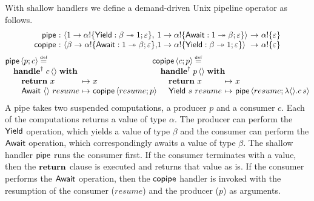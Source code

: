\documentclass[12pt,phd,lfcs,twoside,openright,logo,leftchapter,normalheadings]{infthesis}
\theoremstyle{plain}
\theoremstyle{definition}
\begin{document}
With shallow handlers we define a demand-driven Unix pipeline operator
as follows.
%
\[
    \ba{@{}c@{}}
    \ba{@{}r@{~}c@{~}l@{}l@{~}c@{~}l@{}}
    \Pipe   &:& \Record{\UnitType \to \alpha ! \{ \Yield : \beta \opto \UnitType; \varepsilon \}, &\UnitType \to \alpha!\{ \Await : \UnitType \opto \beta; \varepsilon \}}          &\to& \alpha!\{\varepsilon\} \\
    \Copipe &:& \Record{\beta \to \alpha!\{ \Await : \UnitType \opto \beta; \varepsilon\},    &\UnitType \to \alpha!\{ \Yield : \beta \opto \UnitType; \varepsilon\}} &\to& \alpha!\{\varepsilon\} \\
    \ea \medskip \\
    \ba{@{}l@{\hspace{-0em}}@{\hspace{-2mm}}l@{}}
    \ba[t]{@{}l@{}}
    \Pipe\, \Record{p; c} \defas \\
    \quad
        \bl
        \ShallowHandle\; c\,\Unit \;\With\; \\
        \quad
        \ba[m]{@{}l@{~}c@{~}l@{}}
           \Return~x &\mapsto& x \\
           \Await~\Unit~resume  &\mapsto& \Copipe\,\Record{resume; p} \\
        \ea \\
        \el
    \ea &
    \ba[t]{@{}l@{}}
    \Copipe\, \Record{c; p} \defas \\
        \quad
        \bl
        \ShallowHandle\; p\,\Unit \;\With\; \\
        \quad
        \ba[m]{@{}l@{~}c@{~}l@{}}
          \Return~x &\mapsto& x \\
          \Yield~s~resume &\mapsto& \Pipe\,\Record{resume; \lambda \Unit. c\, s} \\
        \ea \\
        \el \\
   \ea \\
   \ea \\
   \ea
\]
%
A pipe takes two suspended computations, a producer $p$ and a consumer
$c$.
%
Each of the computations returns a value of type $\alpha$.
%
The producer can perform the $\mathsf{Yield}$ operation, which yields a value
of type $\beta$ and the consumer can perform the $\mathsf{Await}$ operation,
which correspondingly awaits a value of type $\beta$.
%
The shallow handler $\mathsf{pipe}$ runs the consumer first. If the consumer
terminates with a value, then the $\mathbf{return}$ clause is executed and
returns that value as is. If the consumer performs the $\mathsf{Await}$
operation, then the $\mathsf{copipe}$ handler is invoked with the resumption
of the consumer ($resume$) and the producer ($p$) as arguments.
\end{document}
